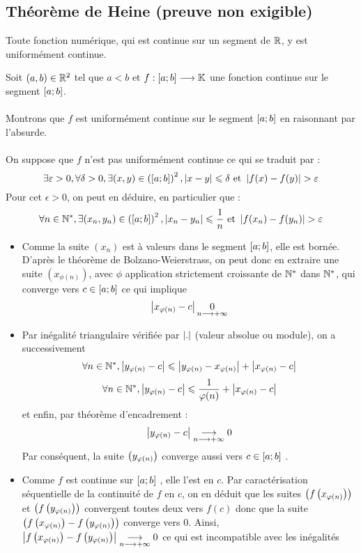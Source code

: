\subsection{Théorème de Heine (preuve non exigible)}
\begin{defprop}
    Toute fonction numérique, qui est continue sur un segment de \(\mathbb{R}\), y est uniformément continue.
\end{defprop}

\begin{dem}
    Soit \((a, b) \in \mathbb{R}^2\) tel que \(a < b\) et \(f : \left[a;b\right] \longrightarrow \mathbb{K}\) une fonction continue sur le segment \(\left[a;b\right]\).\\~\\
    Montrons que \(f\) est uniformément continue sur le segment \(\left[a;b\right]\) en raisonnant par l’absurde.\\~\\
    On suppose que \(f\) n’est pas uniformément continue ce qui se traduit par :
    \[\exists \varepsilon > 0, \forall \delta > 0, \exists  (x, y) \in \left(\left[a;b\right]\right)^2, \left\lvert x - y\right\rvert \leqslant \delta \text{ et } \left\lvert f (x) - f (y)\right\rvert > \varepsilon \]
    Pour cet \(\epsilon > 0\), on peut en déduire, en particulier que :
    \[\forall n \in \mathbb{N}^*, \exists  (x_n, y_n) \in \left(\left[a;b\right]\right)^2 , \left\lvert x_n - y_n\right\rvert \leqslant \frac{1}{n} \text{ et } \left\lvert f (x_n) - f (y_n)\right\rvert > \varepsilon\]
    \begin{itemize}
        \item Comme la suite \((x_n)\) est à valeurs dans le segment \(\left[a;b\right]\), elle est bornée. D’après le théorème de Bolzano-Weierstrass, on peut donc en extraire une suite \((x_{\phi(n)})\), avec \(\phi\) application strictement croissante de \(\mathbb{N}^*\) dans \(\mathbb{N}^*\), qui converge vers \(c \in \left[a;b\right]\) ce qui implique 
        \[\left\lvert x_{\varphi(n)} - c\right\rvert \underset{n\longrightarrow+\infty}{0}\]
        \item Par inégalité triangulaire vérifiée par \(\left\lvert.\right\rvert\) (valeur absolue ou module), on a successivement 
        \[\forall n \in \mathbb{N}^*, \left\lvert y_{\varphi(n)} - c \right\rvert\leqslant \left\lvert y_{\varphi(n)} - x_{\varphi(n)}\right\rvert + \left\lvert x_{\varphi(n)} - c\right\rvert\]
        \[\forall n \in \mathbb{N}^*, \left\lvert y_{\varphi(n)} - c\right\rvert \leqslant \frac{1}{\varphi(n)} + \left\lvert x_{\varphi(n)} - c\right\rvert\]
        et enfin, par théorème d’encadrement :
        \[\left\lvert y_{\varphi(n)} - c\right\rvert \underset{n \longrightarrow +\infty}{\longrightarrow} 0\]
        Par conséquent, la suite \(\left(y_{\varphi(n)}\right)\) converge aussi vers \(c \in \left[a;b\right]\) .
        \item Comme \(f\) est continue sur \(\left[a;b\right]\) , elle l’est en \(c\). Par caractérisation séquentielle de la continuité de \(f\) en \(c\), on en déduit que les suites \(\left(f \left(x_{\varphi(n)}\right)\right)\) et \(\left(f\left( y_{\varphi(n)}\right)\right)\) convergent toutes deux vers \(f (c)\) donc que la suite \(\left(f \left(x_{\varphi(n)}\right)  - f \left( y_{\varphi(n)}\right)\right)\) converge vers \(0\). Ainsi, \(\left\lvert f \left(x_{\varphi(n)}\right)  - f \left( y_{\varphi(n)}\right)\right\rvert\underset{ n\longrightarrow+\infty}{\longrightarrow} 0\) ce qui est incompatible avec les inégalités

\end{itemize}
\end{dem}
